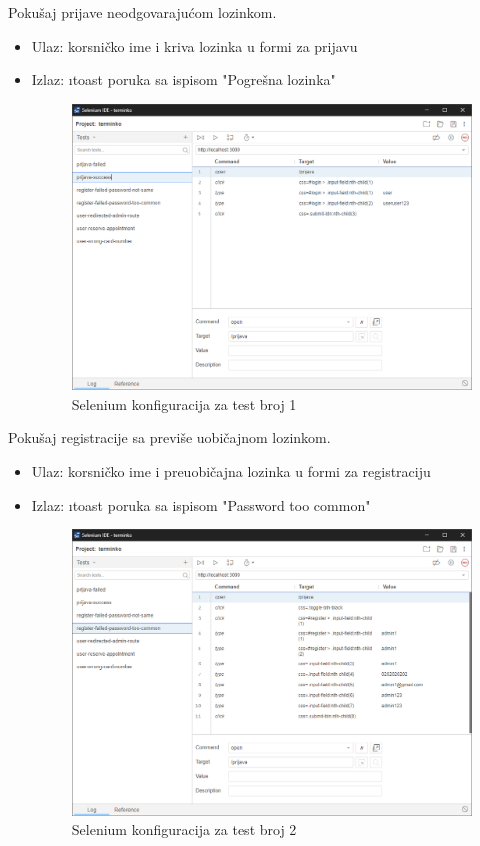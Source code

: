 			 \begin{packed_enum}
			 	\item Pokušaj prijave neodgovarajućom lozinkom.
			 	\begin{itemize}
			 		\item Ulaz: korsničko ime i kriva lozinka u formi za prijavu
			 		\item Izlaz: \i{toast} poruka sa ispisom "Pogrešna lozinka"
			 	\begin{figure}[H]
			 		\includegraphics[width=0.95\linewidth]{slike/test0.png}
			 		\centering
			 		\caption{Selenium konfiguracija za test broj 1}
			 		\label{fig:dijagram_razmjestaja}
			 	\end{figure}
		 		\end{itemize}
	 			\eject
	 		
	 		\item Pokušaj registracije sa previše uobičajnom lozinkom.
	 		\begin{itemize}
	 			\item Ulaz: korsničko ime i preuobičajna lozinka u formi za registraciju
	 			\item Izlaz: \i{toast} poruka sa ispisom "Password too common"
	 			\begin{figure}[H]
	 				\includegraphics[width=0.95\linewidth]{slike/test1.png}
	 				\centering
	 				\caption{Selenium konfiguracija za test broj 2}
	 				\label{fig:dijagram_razmjestaja}
	 			\end{figure}
	 		\end{itemize}
 			\eject
 		

\end{packed_enum}
